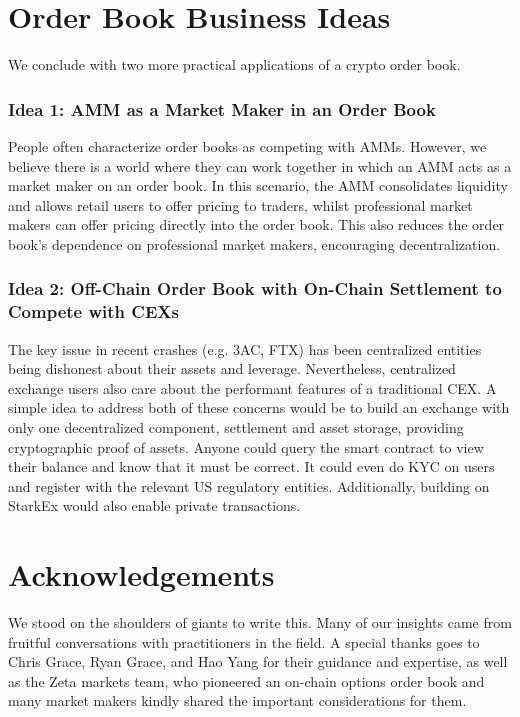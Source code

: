\documentclass{article}
\begin{document}
\section{Order Book Business Ideas}

We conclude with two more practical applications of a crypto order book. 

\subsubsection{Idea 1: AMM as a Market Maker in an Order Book}
\noindent People often characterize order books as competing with AMMs. However, we believe there is a world where they can work together in which an AMM acts as a market maker on an order book. In this scenario, the AMM consolidates liquidity and allows retail users to offer pricing to traders, whilst professional market makers can offer pricing directly into the order book. This also reduces the order book's dependence on professional market makers, encouraging decentralization.

\subsubsection{Idea 2: Off-Chain Order Book with On-Chain Settlement to Compete with CEXs} 
\noindent The key issue in recent crashes (e.g. 3AC, FTX) has been centralized entities being dishonest about their assets and leverage. Nevertheless, centralized exchange users also care about the performant features of a traditional CEX. A simple idea to address both of these concerns would be to build an exchange with only one decentralized component, settlement and asset storage, providing cryptographic proof of assets. Anyone could query the smart contract to view their balance and know that it must be correct. It could even do KYC on users and register with the relevant US regulatory entities. Additionally, building on StarkEx would also enable private transactions. 

\section{Acknowledgements}

We stood on the shoulders of giants to write this. Many of our insights came from fruitful conversations with practitioners in the field. A special thanks goes to Chris Grace, Ryan Grace, and Hao Yang for their guidance and expertise, as well as the Zeta markets team, who pioneered an on-chain options order book and many market makers kindly shared the important considerations for them.
\end{document}
